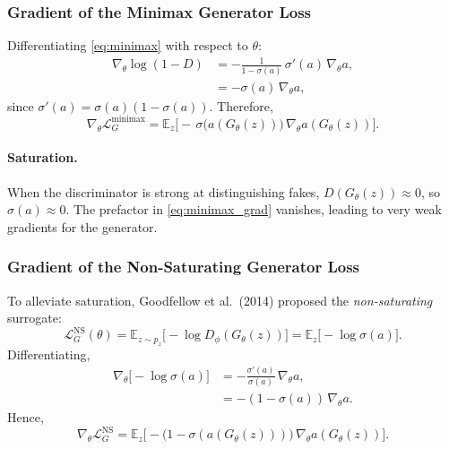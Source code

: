 \documentclass[11pt]{article}
\theoremstyle{remark}
\begin{document}
\subsubsection{Gradient of the Minimax Generator Loss}

Differentiating \eqref{eq:minimax} with respect to $\theta$:
\begin{align}
\nabla_\theta \log(1-D)
&= -\frac{1}{1-\sigma(a)}\,\sigma'(a)\,\nabla_\theta a, \\
&= -\sigma(a)\,\nabla_\theta a,
\end{align}
since $\sigma'(a)=\sigma(a)(1-\sigma(a))$.
Therefore,
\begin{equation}
\label{eq:minimax_grad}
\nabla_\theta \mathcal{L}^{\text{minimax}}_G
= \mathbb{E}_{z}\Big[-\,\sigma\!\big(a(G_\theta(z))\big)\,\nabla_\theta a(G_\theta(z))\Big].
\end{equation}

\paragraph{Saturation.}
When the discriminator is strong at distinguishing fakes, $D(G_\theta(z))\approx 0$,
so $\sigma(a)\approx 0$. The prefactor in \eqref{eq:minimax_grad} vanishes, leading
to very weak gradients for the generator.

\subsubsection{Gradient of the Non-Saturating Generator Loss}

To alleviate saturation, Goodfellow et al.\ (2014) proposed the
\emph{non-saturating} surrogate:
\begin{equation}
\label{eq:ns_loss}
\mathcal{L}^{\text{NS}}_G(\theta)
= \mathbb{E}_{z\sim p_z}\Big[-\log D_\phi(G_\theta(z))\Big]
= \mathbb{E}_{z}\Big[-\log \sigma(a)\Big].
\end{equation}
Differentiating,
\begin{align}
\nabla_\theta \big[-\log \sigma(a)\big]
&= -\frac{\sigma'(a)}{\sigma(a)}\,\nabla_\theta a, \\
&= -(1-\sigma(a))\,\nabla_\theta a.
\end{align}
Hence,
\begin{equation}
\label{eq:ns_grad}
\nabla_\theta \mathcal{L}^{\text{NS}}_G
= \mathbb{E}_{z}\Big[-\big(1-\sigma(a(G_\theta(z)))\big)\,\nabla_\theta a(G_\theta(z))\Big].
\end{equation}
\end{document}
